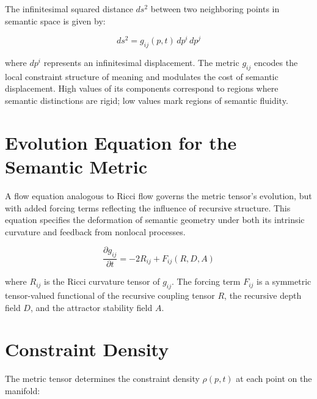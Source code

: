 The infinitesimal squared distance \(ds^2\) between two neighboring points in semantic space is given by:

\begin{equation}
ds^2 = g_{ij}(p, t) \, dp^i \, dp^j
\end{equation}

where \(dp^i\) represents an infinitesimal displacement. The metric \(g_{ij}\) encodes the local constraint structure of meaning and modulates the cost of semantic displacement. High values of its components correspond to regions where semantic distinctions are rigid; low values mark regions of semantic fluidity.


\section{Evolution Equation for the Semantic Metric}
\label{sec:evolution_equation_for_the_semantic_metric}

A flow equation analogous to Ricci flow \autocite{Hamilton1982, Perelman2002, RicciLeviCivita1901} governs the metric tensor's evolution, but with added forcing terms reflecting the influence of recursive structure. This equation specifies the deformation of semantic geometry under both its intrinsic curvature and feedback from nonlocal processes.

\begin{equation}\label{eq:metric_evolution}
\frac{\partial g_{ij}}{\partial t} = -2 R_{ij} + F_{ij}(R, D, A)
\end{equation}

where \(R_{ij}\) is the Ricci curvature tensor of \(g_{ij}\). The forcing term \(F_{ij}\) is a symmetric tensor-valued functional of the recursive coupling tensor \(R\), the recursive depth field \(D\), and the attractor stability field \(A\).


\section{Constraint Density}
\label{sec:constraint_density}

The metric tensor determines the constraint density \(\rho(p, t)\) at each point on the manifold:

